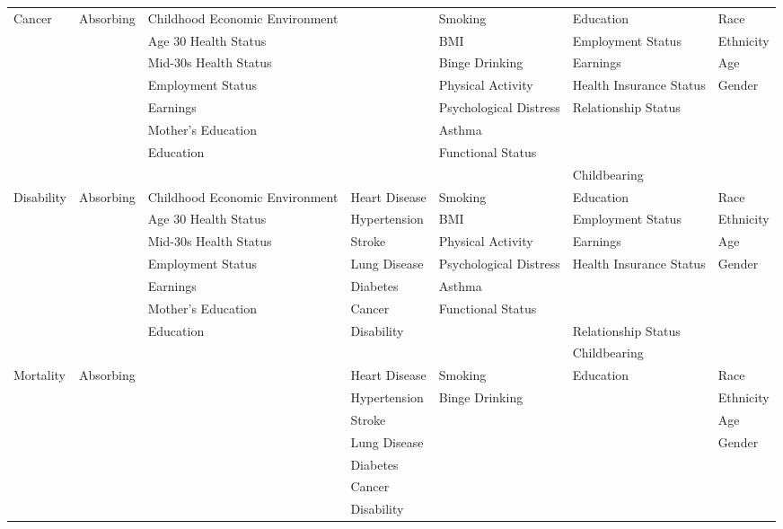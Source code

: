\begin{table}
\begin{tiny}
\begin{tabular}{lllllll}
Cancer & Absorbing & Childhood Economic Environment &  & Smoking & Education & Race \\
			&& Age 30 Health Status & & BMI & Employment Status & Ethnicity \\
			&& Mid-30s Health Status & & Binge Drinking & Earnings & Age \\
			&& Employment Status &   & Physical Activity  & Health Insurance Status & Gender \\
			&& Earnings & & Psychological Distress  & Relationship Status   & \\
			&& Mother's Education & & Asthma &  & \\
			&& Education & & Functional Status &  & \\
			&& & & & Childbearing & \\
\midrule	
Disability & Absorbing & Childhood Economic Environment & Heart Disease & Smoking &Education & Race \\
			&& Age 30 Health Status & Hypertension & BMI & Employment Status & Ethnicity \\
			&& Mid-30s Health Status & Stroke & Physical Activity & Earnings & Age \\
			&& Employment Status &  Lung Disease & Psychological Distress  & Health Insurance Status & Gender \\
			&& Earnings & Diabetes &  Asthma &  & \\
			&& Mother's Education & Cancer & Functional Status  & & \\
			&& Education &  Disability &  & Relationship Status  & \\
			&& & & & Childbearing & \\	
\midrule
 Mortality & Absorbing & & Heart Disease & Smoking & Education & Race \\
&&  & Hypertension & Binge Drinking  & & Ethnicity \\
&& & Stroke & & & Age \\
&& & Lung Disease & & & Gender \\
&& & Diabetes & & & \\
&& & Cancer & & & \\
&& & Disability & & & \\
\bottomrule
\end{tabular}
\end{tiny}
\end{table}

